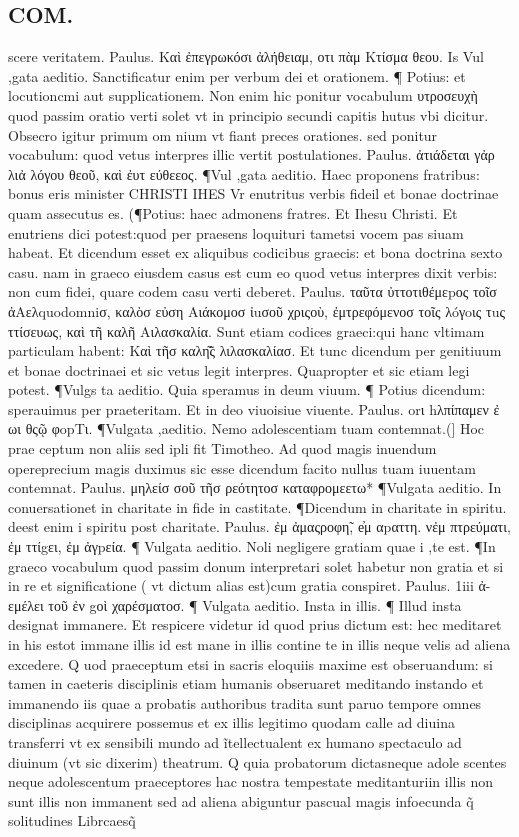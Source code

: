 \documentclass{article}
\begin{document}
\begin{pages}
\section*{COM. }
\marginpar{[ p.4. ]}\pstart scere veritatem. Paulus. Καὶ ἐπεγρωκόσι ἀλήθειαμ, οτι πὰμ Κτίσμα θεου. Is Vul ,gata aeditio. Sanctificatur enim per verbum dei et orationem. ¶ Potius: et locutioncmi aut supplicationem. Non enim hic ponitur vocabulum υτροσευχὴ quod passim oratio verti solet vt in principio secundi capitis hutus vbi dicitur. Obsecro igitur primum om nium vt fiant preces orationes. sed ponitur vocabulum: quod vetus interpres illic vertit postulationes. Paulus. ἀτιάδεται γἀρ λιἀ λόγου θεοῦ, καὶ ἐυτ εύθεεος. ¶Vul ,gata aeditio. Haec proponens fratribus: bonus eris minister CHRISTI IHES Vr enutritus verbis fideil et bonae doctrinae quam assecutus es. (¶Potius: haec admonens fratres. Et Ihesu Christi. Et enutriens dici potest:quod per praesens loquituri tametsi vocem pas siuam habeat. Et dicendum esset ex aliquibus codicibus graecis: et bona doctrina sexto casu. nam in graeco eiusdem casus est cum eo quod vetus interpres dixit verbis: non cum fidei, quare codem casu verti deberet. Paulus. ταῦτα ὐττοτιθέμεpος τοῖσ ἀAελquodomniσ, καλὸσ εὐση Αιάκομοσ ἰuσοῦ χριςοὺ, ἐμτρεφόμενοσ τοῖς λóγoις τuς ττίσευως, καὶ τῆ καλῆ Αιλασκαλία. Sunt etiam codices graeci:qui hanc vltimam particulam habent: Καὶ τῆσ καλη̃͂ς λιλασκαλίασ. Et tunc dicendum per genitiuum et bonae doctrinaei et sic vetus legit interpres. Quapropter et sic etiam legi potest. ¶Vulgs ta aeditio. Quia speramus in deum viuum. ¶ Potius dicendum: sperauimus per praeteritam. Et in deo viuoisiue viuente. Paulus. orι hλπίπαμεν ἐ ωι θςῷ φopTι. ¶Vulgata ,aeditio. Nemo adolescentiam tuam contemnat.(] Hoc prae ceptum non aliis sed ipli fit Timotheo. Ad quod magis inuendum opereprecium magis duximus sic esse dicendum facito nullus tuam iuuentam contemnat. Paulus. μηλείσ σοῦ τῆσ ρεότητοσ καταφρομεετω* ¶Vulgata aeditio. In conuersationet in charitate in fide in castitate. ¶Dicendum in charitate in spiritu. deest enim i spiritu post charitate. Paulus. ἐμ ἀμαςροφη̃, e̓μ αpαττη. νἐμ πτρεύματι, ἐμ ττίgει, ἐμ ἀγpεία. ¶ Vulgata aeditio. Noli negligere gratiam quae i ,te est. ¶In graeco vocabulum quod passim donum interpretari solet habetur non gratia et si in re et significatione ( vt dictum alias est)cum gratia conspiret. Paulus. 1iii ἀ- εμέλει τοῦ ἐν gοὶ χαρέσματοσ. ¶ Vulgata aeditio. Insta in illis. ¶ Illud insta designat immanere. Et respicere videtur id quod prius dictum est: hec meditaret in his estot immane illis id est mane in illis contine te in illis neque velis ad aliena excedere. Q uod praeceptum etsi in sacris eloquiis maxime est obseruandum: si tamen in caeteris disciplinis etiam humanis obseruaret meditando instando et immanendo iis quae a probatis authoribus tradita sunt paruo tempore omnes disciplinas acquirere possemus et ex illis legitimo quodam calle ad diuina transferri vt ex sensibili mundo ad ĩtellectualent ex humano spectaculo ad diuinum (vt sic dixerim) theatrum. Q quia probatorum dictasneque adole scentes neque adolescentum praeceptores hac nostra tempestate meditanturiin illis non sunt illis non immanent sed ad aliena abiguntur pascual magis infoecunda q̃ solitudines Librcaesq̃ 
\end{pages}
\end{document}
